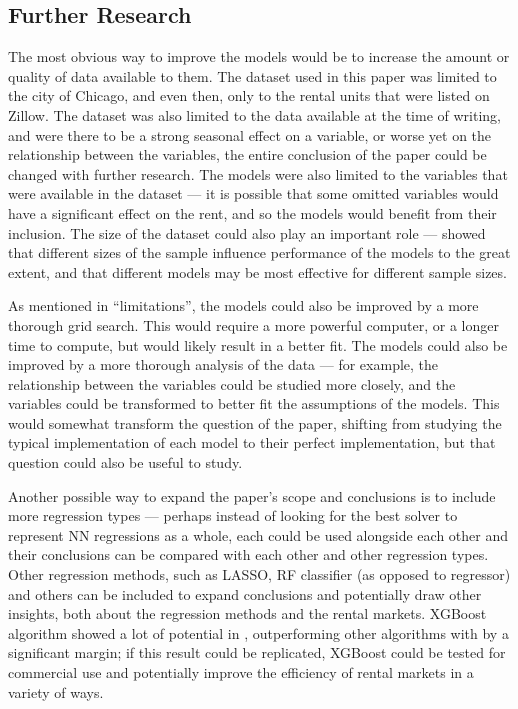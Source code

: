 \documentclass[12pt]{report}
\begin{document}
\subsection{Further Research}
The most obvious way to improve the models would be to increase the amount or quality of data available to them. The dataset used in this paper was limited to the city of Chicago, and even then, only to the rental units that were listed on Zillow. The dataset was also limited to the data available at the time of writing, and were there to be a strong seasonal effect on a variable, or worse yet on the relationship between the variables, the entire conclusion of the paper could be changed with further research. The models were also limited to the variables that were available in the dataset --- it is possible that some omitted variables would have a significant effect on the rent, and so the models would benefit from their inclusion. The size of the dataset could also play an important role --- \textcite{yoshida2022} showed that different sizes of the sample influence performance of the models to the great extent, and that different models may be most effective for different sample sizes. 

As mentioned in ``limitations'', the models could also be improved by a more thorough grid search. This would require a more powerful computer, or a longer time to compute, but would likely result in a better fit. The models could also be improved by a more thorough analysis of the data --- for example, the relationship between the variables could be studied more closely, and the variables could be transformed to better fit the assumptions of the models. This would somewhat transform the question of the paper, shifting from studying the typical implementation of each model to their perfect implementation, but that question could also be useful to study.

Another possible way to expand the paper's scope and conclusions is to include more regression types --- perhaps instead of looking for the best solver to represent NN regressions as a whole, each could be used alongside each other and their conclusions can be compared with each other and other regression types. Other regression methods, such as LASSO, RF classifier (as opposed to regressor) and others can be included to expand conclusions and potentially draw other insights, both about the regression methods and the rental markets. XGBoost algorithm showed a lot of potential in \textcite{yoshida2022}, outperforming other algorithms with by a significant margin; if this result could be replicated, XGBoost could be tested for commercial use and potentially improve the efficiency of rental markets in a variety of ways.
\end{document}
